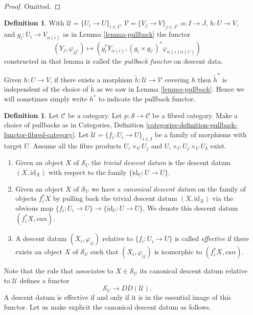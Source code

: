 \documentclass{stacks-project}
\theoremstyle{plain}
\theoremstyle{definition}
\newtheorem{definition}[subsection]{Definition}
\theoremstyle{remark}
\numberwithin{equation}{subsection}
\begin{document}
\begin{proof}
Omitted.
\end{proof}

\begin{definition}
\label{definition-pullback-functor}
With $\mathcal{U} = \{U_i \to U\}_{i \in I}$,
$\mathcal{V} = \{V_j \to V\}_{j \in J}$,
$\alpha : I \to J$, $h : U \to V$,
and $g_i : U_i \to V_{\alpha(i)}$ as in Lemma \ref{lemma-pullback}
the functor
$$
(Y_j, \varphi_{jj'}) \longmapsto
(g_i^*Y_{\alpha(i)}, (g_i \times g_{i'})^*\varphi_{\alpha(i)\alpha(i')})
$$
constructed in that lemma
is called the {\it pullback functor} on descent data.
\end{definition}

\noindent
Given $h : U \to V$, if there exists a morphism
$\tilde h : \mathcal{U} \to \mathcal{V}$ covering $h$
then $\tilde h^*$ is independent of the choice of
$\tilde h$ as we saw in Lemma \ref{lemma-pullback}.
Hence we will sometimes simply write $h^*$ to indicate
the pullback functor.

\begin{definition}
\label{definition-effective-descent-datum}
Let $\mathcal{C}$ be a category.
Let $p : \mathcal{S} \to \mathcal{C}$ be a fibred category.
Make a choice of pullbacks as in Categories,
Definition \ref{categories-definition-pullback-functor-fibred-category}.
Let $\mathcal{U} = \{f_i : U_i \to U\}_{i \in I}$ be a family of morphisms
with target $U$. Assume all the fibre products
$U_i \times_U U_j$ and $U_i \times_U U_j \times_U U_k$ exist.
\begin{enumerate}
\item Given an object $X$ of $\mathcal{S}_U$ the {\it trivial descent datum}
is the descent datum $(X, \text{id}_X)$ with respect to the family
$\{\text{id}_U : U \to U\}$.
\item Given an object $X$ of $\mathcal{S}_U$
we have a {\it canonical descent datum} on the family of
objects $f_i^*X$ by pulling back the trivial
descent datum $(X, \text{id}_X)$ via the
obvious map $\{f_i : U_i \to U\} \to \{\text{id}_U : U \to U\}$.
We denote this descent datum $(f_i^*X, can)$.
\item A descent datum $(X_i, \varphi_{ij})$
relative to $\{f_i : U_i \to U\}$ is called {\it effective}
if there exists an object $X$ of $\mathcal{S}_U$ such that
$(X_i, \varphi_{ij})$ is isomorphic to $(f_i^*X, can)$.
\end{enumerate}
\end{definition}

\noindent
Note that the rule that associates to $X \in \mathcal{S}_U$ its
canonical descent datum relative to $\mathcal{U}$ defines a
functor
$$
\mathcal{S}_U \longrightarrow DD(\mathcal{U}).
$$
A descent datum is effective if and only if it is in the essential
image of this functor.
Let us make explicit the canonical descent datum as follows.
\end{document}

